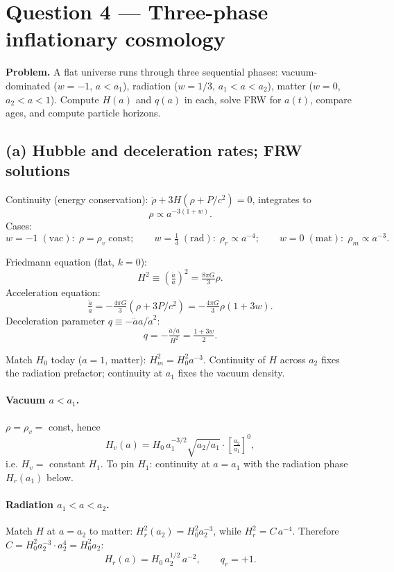 \documentclass[11pt]{article}
\begin{document}
\section*{Question 4 --- Three-phase inflationary cosmology}

\textbf{Problem.} A flat universe runs through three sequential phases: vacuum-dominated ($w=-1$, $a<a_1$), radiation ($w=1/3$, $a_1<a<a_2$), matter ($w=0$, $a_2<a<1$). Compute $H(a)$ and $q(a)$ in each, solve FRW for $a(t)$, compare ages, and compute particle horizons.

\subsection*{(a) Hubble and deceleration rates; FRW solutions}

Continuity (energy conservation): $\dot\rho + 3H(\rho+P/c^2)=0$, integrates to
\[
\rho \propto a^{-3(1+w)}.
\]
Cases:
\[
w=-1\;(\text{vac}):\;\rho=\rho_v\;\text{const};\qquad w=\tfrac13\;(\text{rad}):\;\rho_r\propto a^{-4};\qquad w=0\;(\text{mat}):\;\rho_m\propto a^{-3}.
\]

Friedmann equation (flat, $k=0$):
\begin{equation}
H^2 \equiv \!\left(\tfrac{\dot a}{a}\right)^{\!2} = \tfrac{8\pi G}{3}\rho.
\label{eq:fried}
\end{equation}
Acceleration equation:
\begin{equation}
\tfrac{\ddot a}{a} = -\tfrac{4\pi G}{3}\!\left(\rho + 3P/c^2\right) = -\tfrac{4\pi G}{3}\rho(1+3w).
\label{eq:accel}
\end{equation}
Deceleration parameter $q\equiv -\ddot a a/\dot a^2$:
\[
q = -\tfrac{\ddot a/a}{H^2} = \tfrac{1+3w}{2}.
\]

Match $H_0$ today ($a=1$, matter): $H_m^2 = H_0^2 a^{-3}$. Continuity of $H$ across $a_2$ fixes the radiation prefactor; continuity at $a_1$ fixes the vacuum density.

\paragraph{Vacuum $a<a_1$.} $\rho=\rho_v=$ const, hence
\[
\boxed{\;H_v(a) = H_0\,a_1^{-3/2}\sqrt{a_2/a_1}\cdot\!\left[\tfrac{a_2}{a_1}\right]^{0}\!,\;}
\]
i.e. $H_v=$ constant $H_1$. To pin $H_1$: continuity at $a=a_1$ with the radiation phase $H_r(a_1)$ below.

\paragraph{Radiation $a_1<a<a_2$.} Match $H$ at $a=a_2$ to matter: $H_r^2(a_2) = H_0^2 a_2^{-3}$, while $H_r^2 = C\,a^{-4}$. Therefore $C = H_0^2 a_2^{-3}\cdot a_2^4 = H_0^2 a_2$:
\[
\boxed{\;H_r(a) = H_0\,a_2^{1/2}\,a^{-2},\qquad q_r = +1.\;}
\]
\end{document}
